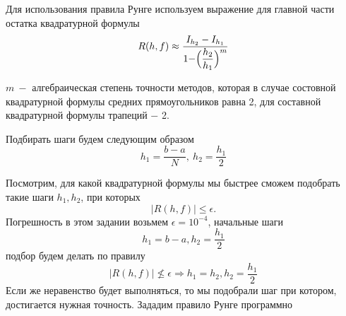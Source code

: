 \documentclass[11pt]{article}
\begin{document}
    Для использования правила Рунге используем выражение для главной части
остатка квадратурной формулы
\[R(h, f) \approx \dfrac{I_{h_2} - I_{h_1}}{1 - \Bigr( \dfrac{h_2}{h_1} \Bigl)^m}\]

\(m \ -\) алгебраическая степень точности методов, которая в случае состовной квадратурной формулы средних прямоугольников равна 2, для составной квадратурной формулы трапеций $-$ 2.

Подбирать шаги будем следующим образом
\[h_1 = \dfrac{b-a}{N}, \ h_2 = \dfrac{h_1}{2}\]

Посмотрим, для какой квадратурной формулы мы быстрее сможем подобрать
такие шаги \(h_1, h_2\), при которых \[|R(h,f)| \leq \epsilon.\]
Погрешность в этом задании возьмем \(\epsilon = 10^{-4}\), начальные
шаги \[h_1=b-a, h_2 = \frac{h_1}{2}\] подбор будем делать по правилу
\[|R(h,f)| \nleq \epsilon \Rightarrow h_1 = h_2, h_2 = \frac{h_1}{2}\]
Если же неравенство будет выполняться, то мы подобрали шаг при котором,
достигается нужная точность. Зададим правило Рунге программно
\end{document}
